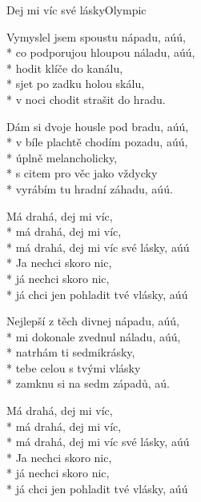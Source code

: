 \documentclass[10.5pt]{book}
\begin{document}
\begin{poem}{Dej mi víc své lásky}{Olympic}

\settowidth{\versewidth}{Vymyslel jsem spoustu nápadu, aúú,}

Vymyslel jsem spoustu nápadu, aúú,\\*
co podporujou hloupou náladu, aúú,\\*
hodit klíče do kanálu,\\*
sjet po zadku holou skálu,\\*
v noci chodit strašit do hradu.

Dám si dvoje housle pod bradu, aúú,\\*
v bíle plachtě chodím pozadu, aúú,\\*
úplně melancholicky,\\*
s citem pro věc jako vždycky\\*
vyrábím tu hradní záhadu, aúú.

Má drahá, dej mi víc,\\*
má drahá, dej mi víc,\\*
má drahá, dej mi víc své lásky, aúú\\*
Ja nechci skoro nic,\\*
já nechci skoro nic,\\*
já chci jen pohladit tvé vlásky, aúú

Nejlepší z těch divnej nápadu, aúú,\\*
mi dokonale zvednul náladu, aúú,\\*
natrhám ti sedmikrásky,\\*
tebe celou s tvými vlásky\\*
zamknu si na sedm západů, aú.

Má drahá, dej mi víc,\\*
má drahá, dej mi víc,\\*
má drahá, dej mi víc své lásky, aúú\\*
Ja nechci skoro nic,\\*
já nechci skoro nic,\\*
já chci jen pohladit tvé vlásky, aúú

\end{poem}
\end{document}
